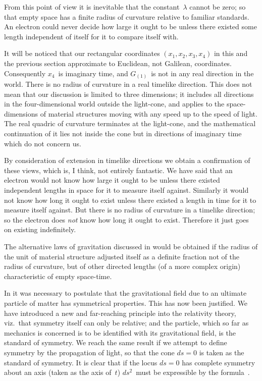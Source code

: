 \documentclass[12pt]{book}
\begin{document}
From this point of view it is inevitable that the constant~$\lambda$ cannot be
zero; so that empty space has a finite radius of curvature relative to familiar
standards. An electron could never decide how large it ought to be unless
there existed some length independent of itself for it to compare itself with.

It will be noticed that our rectangular coordinates $(x_{1}, x_{2}, x_{3}, x_{4})$ in this
and the previous section approximate to Euclidean, not Galilean, coordinates.
Consequently $x_{4}$~is imaginary time, and $G_{(1)}$~is not in any real direction
in the world. There is no radius of curvature in a real timelike direction.
This does not mean that our discussion is limited to three dimensions; it
includes all directions in the four\hyp{}dimensional world outside the light-cone,
and applies to the space\hyp{}dimensions of material structures moving with any
speed up to the speed of light. The real quadric of curvature terminates at
the light-cone, and the mathematical continuation of it lies not inside the
cone but in directions of imaginary time which do not concern us.

By consideration of extension in timelike directions we obtain a confirmation
of these views, which is, I think, not entirely fantastic. We have said that
an electron would not know how large it ought to be unless there existed independent
lengths in space for it to measure itself against. Similarly it would
not know how long it ought to exist unless there existed a length in time for
it to measure itself against. But there is no radius of curvature in a timelike
direction; so the electron does \emph{not} know how long it ought to exist. Therefore
it just goes on existing indefinitely.

The alternative laws of gravitation discussed in  would be obtained if
the radius of the unit of material structure adjusted itself as a definite fraction
not of the radius of curvature, but of other directed lengths (of a more complex
origin) characteristic of empty space-time.

In  it was necessary to postulate that the gravitational field due to an
ultimate particle of matter has symmetrical properties. This has now been
%
justified. We have introduced a new and far\hyp{}reaching principle into the
relativity theory, viz.\ that symmetry itself can only be relative; and the
%
%
particle, which so far as mechanics is concerned is to be identified with its
gravitational field, is the standard of symmetry. We reach the same result if
we attempt to define symmetry by the propagation of light, so that the cone
$ds = 0$ is taken as the standard of symmetry. It is clear that if the locus
$ds = 0$ has complete symmetry about an axis (taken as the axis of~$t$) $ds^{2}$~must
be expressible by the formula~.
\end{document}
